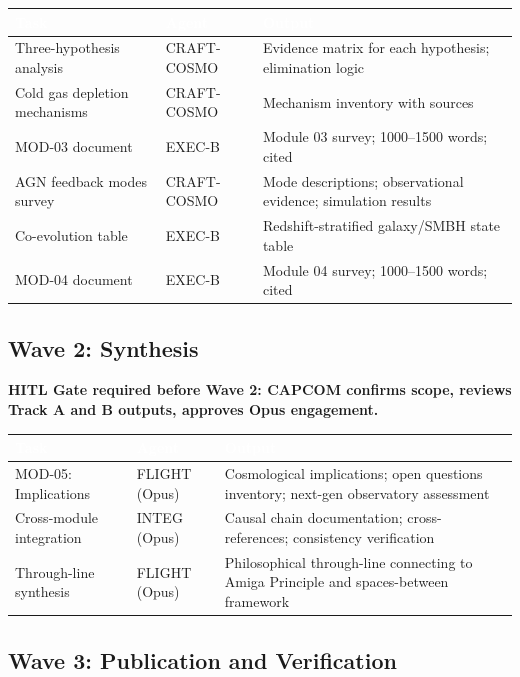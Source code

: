\documentclass[11pt,letterpaper]{article}
\newcommand{\tableheader}[1]{\textbf{\sffamily\textcolor{white}{#1}}}
\begin{document}
\begin{center}
\begin{tabularx}{\textwidth}{L{3cm}L{2cm}X}
\toprule
{}
\tableheader{Task} & \tableheader{Agent} & \tableheader{Output} \\
\midrule
Three-hypothesis analysis & CRAFT-COSMO & Evidence matrix for each hypothesis; elimination logic \\
Cold gas depletion mechanisms & CRAFT-COSMO & Mechanism inventory with sources \\
MOD-03 document & EXEC-B & Module 03 survey; 1000--1500 words; cited \\
AGN feedback modes survey & CRAFT-COSMO & Mode descriptions; observational evidence; simulation results \\
Co-evolution table & EXEC-B & Redshift-stratified galaxy/SMBH state table \\
MOD-04 document & EXEC-B & Module 04 survey; 1000--1500 words; cited \\
\bottomrule
\end{tabularx}
\end{center}

\subsection{Wave 2: Synthesis}

\textbf{HITL Gate required before Wave 2: CAPCOM confirms scope, reviews Track A and B outputs, approves Opus engagement.}

\begin{center}
\begin{tabularx}{\textwidth}{L{3cm}L{2cm}X}
\toprule
{}
\tableheader{Task} & \tableheader{Agent} & \tableheader{Output} \\
\midrule
MOD-05: Implications & FLIGHT (Opus) & Cosmological implications; open questions inventory; next-gen observatory assessment \\
Cross-module integration & INTEG (Opus) & Causal chain documentation; cross-references; consistency verification \\
Through-line synthesis & FLIGHT (Opus) & Philosophical through-line connecting to Amiga Principle and spaces-between framework \\
\bottomrule
\end{tabularx}
\end{center}

\subsection{Wave 3: Publication and Verification}
\end{document}
